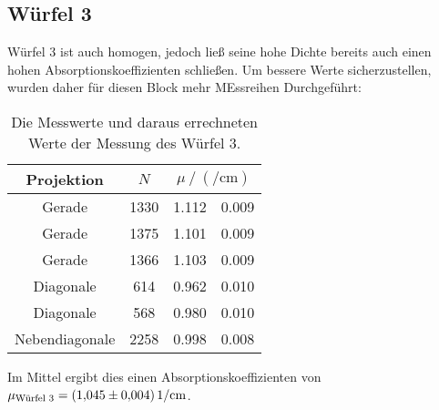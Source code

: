   \subsection{Würfel 3}
    Würfel 3 ist auch homogen, jedoch ließ seine hohe Dichte bereits auch einen hohen Absorptionskoeffizienten schließen. 
    Um bessere Werte sicherzustellen, wurden daher für diesen Block mehr MEssreihen Durchgeführt:
    \begin{table}[H]
     \centering
     \caption{Die Messwerte und daraus errechneten Werte der Messung des Würfel 3.}
     \label{tab:w2}
     \begin{tabular}{c S[table-format=4.0] S[table-format=1.3] @{${}\pm{}$} S[table-format=1.3]}
       \toprule
       {Projektion} &  &  \\
       \midrule
       Gerade & 1330 & 1.112 & 0.009 \\
       Gerade & 1375 & 1.101 & 0.009 \\
       Gerade & 1366 & 1.103 & 0.009 \\
       Diagonale & 614 & 0.962 & 0.010 \\
       Diagonale & 568 & 0.980 & 0.010 \\
       Nebendiagonale & 2258 & 0.998 & 0.008 \\
       \bottomrule  
     \end{tabular}
    \end{table} 
    Im Mittel ergibt dies einen Absorptionskoeffizienten von $\mu_\t{Würfel 3} = \SI{1.045(0004)}{1\per\centi\metre}$.
    